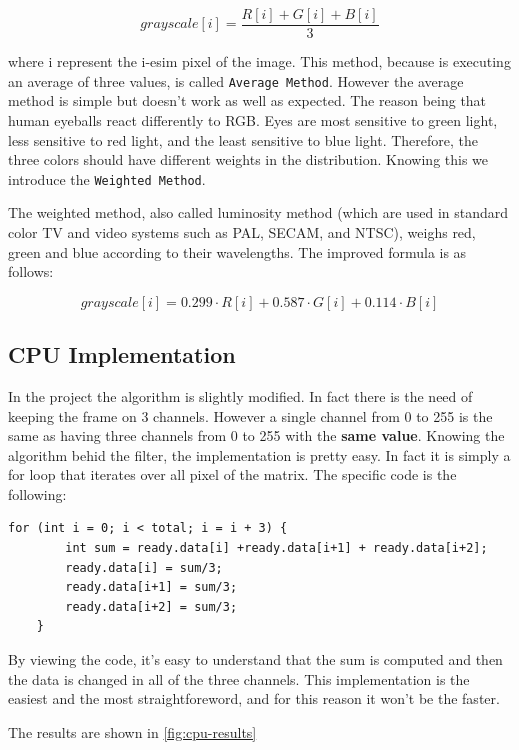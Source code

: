 \documentclass[paper=a4, fontsize=10pt]{scrartcl}	%
\begin{document}
	\begin{equation*}
		grayscale[i] = \frac{R[i] + G[i] + B[i]}{3}
	\end{equation*}

	where i represent the i-esim pixel of the image. This method, because is executing an average of three values, is called \texttt{Average Method}. 
	However the average method is simple but doesn't work as well as expected. The reason being that human eyeballs react differently to RGB. Eyes are most sensitive to green light, less sensitive to red light, and the least sensitive to blue light. Therefore, the three colors should have different weights in the distribution. Knowing this we introduce the \texttt{Weighted Method}.
	
	The weighted method, also called luminosity method (which are used in standard color TV and video systems such as PAL, SECAM, and NTSC), weighs red, green and blue according to their wavelengths. The improved formula is as follows:

	\begin{equation*}
		grayscale[i] = 0.299 \cdot R[i] + 0.587 \cdot G[i] + 0.114 \cdot B[i]
	\end{equation*}

	\subsection{CPU Implementation}
	In the project the algorithm is slightly modified. In fact there is the need of keeping the frame on 3 channels. However a single channel from 0 to 255 is the same as having three channels from 0 to 255 with the \textbf{same value}. 
	Knowing the algorithm behid the filter, the implementation is pretty easy. In fact it is simply a for loop that iterates over all pixel of the matrix. The specific code is the following:

	\begin{lstlisting}[style=CStyle]
	for (int i = 0; i < total; i = i + 3) {
		int sum = ready.data[i] +ready.data[i+1] + ready.data[i+2];
		ready.data[i] = sum/3;
		ready.data[i+1] = sum/3;
		ready.data[i+2] = sum/3;
	}
	\end{lstlisting}

	By viewing the code, it's easy to understand that the sum is computed and then the data is changed in all of the three channels. 
	This implementation is the easiest and the most straightforeword, and for this reason it won't be the faster. 

	The results are shown in \autoref{fig:cpu-results}
\end{document}
